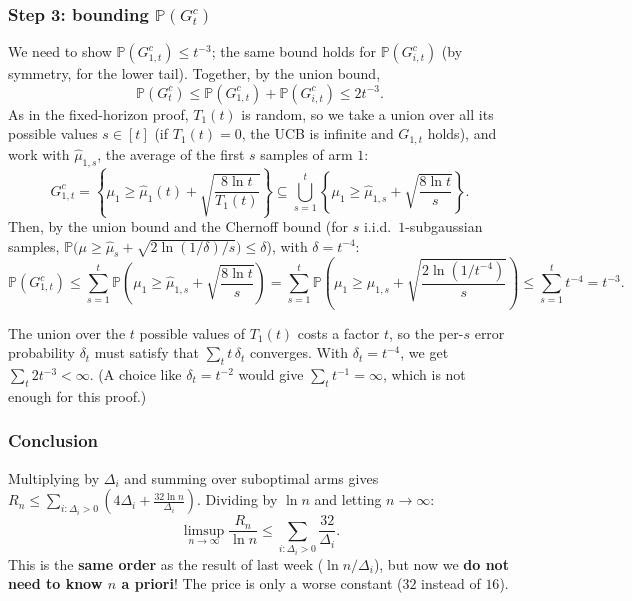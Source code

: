 \subsubsection*{Step 3: bounding $\mathbb{P}(G_t^c)$}

We need to show $\mathbb{P}(G_{1,t}^c) \leq t^{-3}$; the same bound holds for $\mathbb{P}(G_{i,t}^c)$ (by symmetry, for the lower tail). Together, by the union bound,
\[
\mathbb{P}(G_t^c) \leq \mathbb{P}(G_{1,t}^c) + \mathbb{P}(G_{i,t}^c) \leq 2t^{-3}.
\]
As in the fixed-horizon proof, $T_1(t)$ is random, so we take a union over all its possible values $s \in [t]$ (if $T_1(t) = 0$, the UCB is infinite and $G_{1,t}$ holds), and work with $\hat{\mu}_{1,s}$, the average of the first $s$ samples of arm $1$:
\[
G_{1,t}^c = \left\{\mu_1 \geq \hat{\mu}_1(t) + \sqrt{\frac{8\ln t}{T_1(t)}}\right\} \subseteq \bigcup_{s=1}^t \left\{\mu_1 \geq \hat{\mu}_{1,s} + \sqrt{\frac{8\ln t}{s}}\right\}.
\]
Then, by the union bound and the Chernoff bound (for $s$ i.i.d.\ $1$-subgaussian samples, $\mathbb{P}\big(\mu \geq \hat{\mu}_s + \sqrt{2\ln(1/\delta)/s}\big) \leq \delta$), with $\delta = t^{-4}$:
\[
\mathbb{P}(G_{1,t}^c) \leq \sum_{s=1}^t \mathbb{P}\left(\mu_1 \geq \hat{\mu}_{1,s} + \sqrt{\frac{8\ln t}{s}}\right) = \sum_{s=1}^t \mathbb{P}\left(\mu_1 \geq \hat{\mu}_{1,s} + \sqrt{\frac{2\ln(1/t^{-4})}{s}}\right) \leq \sum_{s=1}^t t^{-4} = t^{-3}.
\]

\begin{remark}[Why $t^{-4}$?]
The union over the $t$ possible values of $T_1(t)$ costs a factor $t$, so the per-$s$ error probability $\delta_t$ must satisfy that $\sum_t t\,\delta_t$ converges. With $\delta_t = t^{-4}$, we get $\sum_t 2t^{-3} < \infty$. (A choice like $\delta_t = t^{-2}$ would give $\sum_t t^{-1} = \infty$, which is not enough for this proof.)
\end{remark}

\subsubsection*{Conclusion}

Multiplying by $\Delta_i$ and summing over suboptimal arms gives $R_n \leq \sum_{i:\Delta_i>0}\left(4\Delta_i + \frac{32\ln n}{\Delta_i}\right)$. Dividing by $\ln n$ and letting $n \to \infty$:
\[
\limsup_{n\to\infty} \frac{R_n}{\ln n} \leq \sum_{i:\Delta_i > 0} \frac{32}{\Delta_i}.
\]
This is the \textbf{same order} as the result of last week ($\ln n/\Delta_i$), but now we \textbf{do not need to know $n$ a priori}! The price is only a worse constant ($32$ instead of $16$).

